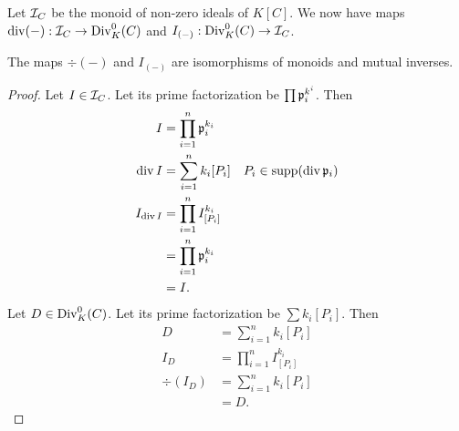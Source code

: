 Let $\cal I_C$ be the monoid of non-zero ideals of $K[C]$.
We now have maps $\div(-) : \cal I_C \to \Div_K^0(C)$ and $I_{(-)} : \Div_K^0(C) \to \cal I_C$.
\begin{theorem}
  The maps $\div(-)$ and $I_{(-)}$ are isomorphisms of monoids and mutual inverses.
\end{theorem}
\begin{proof}
  Let $I \in \cal I_C$. Let its prime factorization be $\prod \frak p_i^{k^i}$. Then
  \begin{align*}
    I &= \prod_{i=1}^n \frak p_i^{k_i} \\
    \div I &= \sum_{i=1}^n k_i[P_i]
      & P_i \in \supp(\div \frak p_i) \\
    I_{\div I} &= \prod_{i=1}^n I_{[P_i]}^{k_i} \\
               &= \prod_{i=1}^n \frak p_i^{k_i} \\
               &= I.
  \end{align*}
  Let $D \in \Div_K^0(C)$. Let its prime factorization be $\sum k_i[P_i]$. Then
  \begin{align*}
    D &= \sum_{i=1}^n k_i[P_i] \\
    I_D &= \prod_{i=1}^n I_{[P_i]}^{k_i} \\
    \div(I_D) &= \sum_{i=1}^n k_i [P_i] \\ &= D.
  \end{align*}
\end{proof}
\begin{comment}
\begin{proof}
  The proof is quite immediate after factoring each ideal.
  It has already been established that $\div$ maps the identity $K[C]$ of $\cal I_C$ to the identity $0$ of $\Div_K^0(C)$.
  Let $\frak a$ and $\frak b$ be non-zero ideals with prime factorizations
  \[ \frak a = \prod \frak p_i^{k_i}, ~~~ \frak b = \prod \frak q_i^{\ell_i}. \]
  Then
  \begin{align*}
    \div (\frak a \frak b)
      &= \div \left( \left( \prod \frak p_i^{k_i} \right) \left( \prod \frak q_j^{\ell_j} \right) \right) \\
      &= \sum k_i \div \frak p_i + \sum \ell_j \div \frak q_i \\
      &= \div \frak a + \div \frak b.
  \end{align*}
\end{proof}
\end{comment}




